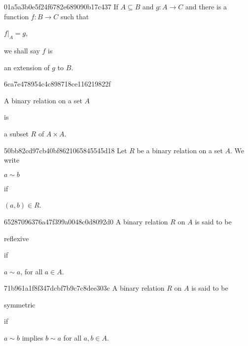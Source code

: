 \begin{note}{01a5a3b0e5f24f6782e689090b17c437}
    If \({ A \subseteq B }\) and \({ g : A \to C }\) and there is a function \({ f : B \to C }\) such that \begin{icloze}{2}\({ f|_{A} = g }\),\end{icloze} we shall say \({ f }\) is \begin{icloze}{1}an extension of \({ g }\) to \({ B }\).\end{icloze}
\end{note}

\begin{note}{6ca7e478954c4c898718ce116219822f}
    \begin{icloze}{2}A binary relation on a set \({ A }\)\end{icloze} is \begin{icloze}{1}a subset \({ R }\) of \({ A \times A }\).\end{icloze}
\end{note}

\begin{note}{50bb82cd97cb40bf8621065845545d18}
    Let \({ R }\) be a binary relation on a set \({ A }\).
    We write \begin{icloze}{2}\({ a \sim b }\)\end{icloze} if \begin{icloze}{1}\({ (a, b) \in R }\).\end{icloze}
\end{note}

\begin{note}{65287096376a47f399a0048c0d8092d0}
    A binary relation \({ R }\) on \({ A }\) is said to be \begin{icloze}{2}reflexive\end{icloze} if
    \begin{icloze}{1}
        \begin{center}
            \({ a \sim a }\), for all \({ a \in A }\).
        \end{center}
    \end{icloze}
\end{note}

\begin{note}{71b961a1f8f347dcbf7b9c7c8dee303c}
    A binary relation \({ R }\) on \({ A }\) is said to be \begin{icloze}{2}symmetric\end{icloze} if
    \begin{icloze}{1}
        \begin{center}
            \({ a \sim b }\) implies \({ b \sim a }\) for all \({ a, b \in A }\).
        \end{center}
    \end{icloze}
\end{note}

